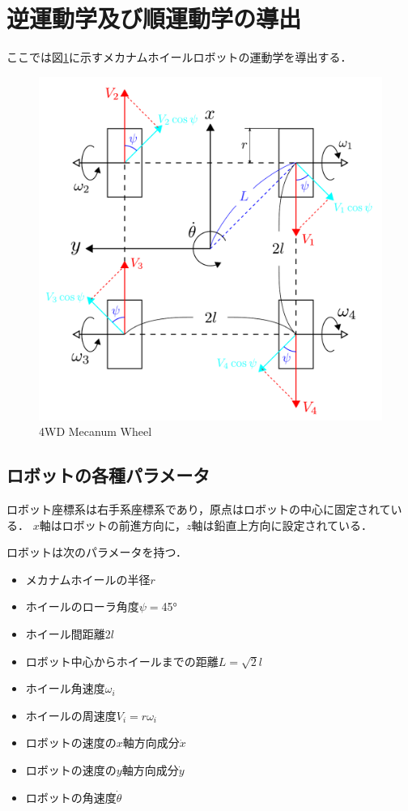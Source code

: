 \documentclass[../master]{subfiles}
\begin{document}
  \section{逆運動学及び順運動学の導出}

  ここでは図\ref{fig:mecanum}に示すメカナムホイールロボットの運動学を導出する．

  \begin{figure}[h]
    \centering
    \includegraphics[width=120truemm, clip]{images/mecanum.pdf}
    \caption{4WD Mecanum Wheel}
    \label{fig:mecanum}
  \end{figure}

  \subsection{ロボットの各種パラメータ}

  ロボット座標系は右手系座標系であり，原点はロボットの中心に固定されている．
  $x$軸はロボットの前進方向に，$z$軸は鉛直上方向に設定されている．



  ロボットは次のパラメータを持つ．

  \begin{itemize}
    \item メカナムホイールの半径$r$
    \item ホイールのローラ角度$\psi =$\ang{45}
    \item ホイール間距離$2l$
    \item ロボット中心からホイールまでの距離$L = \sqrt{2}l$
    \item ホイール角速度$\omega_{i}$
    \item ホイールの周速度$V_{i} = r\omega_{i}$
    \item ロボットの速度の$x$軸方向成分$\dot{x}$
    \item ロボットの速度の$y$軸方向成分$\dot{y}$
    \item ロボットの角速度$\dot{\theta}$
  \end{itemize}
\end{document}
